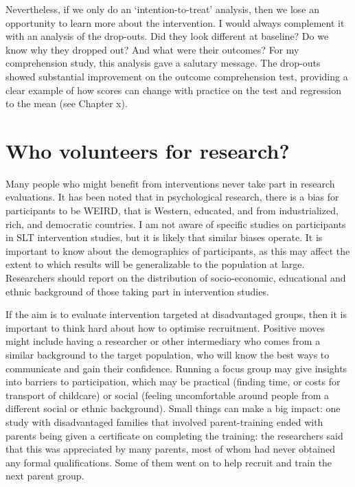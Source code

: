 \documentclass[]{book}
\begin{document}
Nevertheless, if we only do an `intention-to-treat' analysis, then we lose an opportunity to learn more about the intervention. I would always complement it with an analysis of the drop-outs. Did they look different at baseline? Do we know why they dropped out? And what were their outcomes? For my comprehension study, this analysis gave a salutary message. The drop-outs showed substantial improvement on the outcome comprehension test, providing a clear example of how scores can change with practice on the test and regression to the mean (see Chapter x).

\hypertarget{who-volunteers-for-research}{%
\section{Who volunteers for research?}\label{who-volunteers-for-research}}

Many people who might benefit from interventions never take part in research evaluations. It has been noted that in psychological research, there is a bias for participants to be WEIRD, that is Western, educated, and from industrialized, rich, and democratic countries. I am not aware of specific studies on participants in SLT intervention studies, but it is likely that similar biases operate. It is important to know about the demographics of participants, as this may affect the extent to which results will be generalizable to the population at large. Researchers should report on the distribution of socio-economic, educational and ethnic background of those taking part in intervention studies.

If the aim is to evaluate intervention targeted at disadvantaged groups, then it is important to think hard about how to optimise recruitment. Positive moves might include having a researcher or other intermediary who comes from a similar background to the target population, who will know the best ways to communicate and gain their confidence. Running a focus group may give insights into barriers to participation, which may be practical (finding time, or costs for transport of childcare) or social (feeling uncomfortable around people from a different social or ethnic background). Small things can make a big impact: one study with disadvantaged families that involved parent-training ended with parents being given a certificate on completing the training: the researchers said that this was appreciated by many parents, most of whom had never obtained any formal qualifications. Some of them went on to help recruit and train the next parent group.
\end{document}

